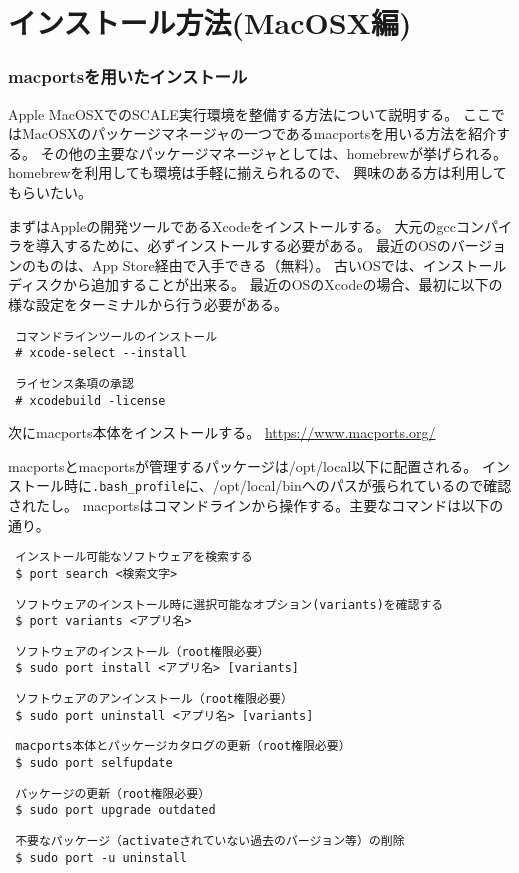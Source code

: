\section{インストール方法(MacOSX編)}

\subsubsection{macportsを用いたインストール}

Apple MacOSXでのSCALE実行環境を整備する方法について説明する。
ここではMacOSXのパッケージマネージャの一つであるmacportsを用いる方法を紹介する。
その他の主要なパッケージマネージャとしては、homebrewが挙げられる。homebrewを利用しても環境は手軽に揃えられるので、
興味のある方は利用してもらいたい。

まずはAppleの開発ツールであるXcodeをインストールする。
大元のgccコンパイラを導入するために、必ずインストールする必要がある。
最近のOSのバージョンのものは、App Store経由で入手できる（無料）。
古いOSでは、インストールディスクから追加することが出来る。
最近のOSのXcodeの場合、最初に以下の様な設定をターミナルから行う必要がある。
\begin{verbatim}
 コマンドラインツールのインストール
 # xcode-select --install
\end{verbatim}
\begin{verbatim}
 ライセンス条項の承認
 # xcodebuild -license
\end{verbatim}

次にmacports本体をインストールする。
\url{https://www.macports.org/}

macportsとmacportsが管理するパッケージは/opt/local以下に配置される。
インストール時に\verb|.bash_profile|に、/opt/local/binへのパスが張られているので確認されたし。
macportsはコマンドラインから操作する。主要なコマンドは以下の通り。

\begin{verbatim}
 インストール可能なソフトウェアを検索する
 $ port search <検索文字>
\end{verbatim}
\begin{verbatim}
 ソフトウェアのインストール時に選択可能なオプション(variants)を確認する
 $ port variants <アプリ名>
\end{verbatim}
\begin{verbatim}
 ソフトウェアのインストール（root権限必要）
 $ sudo port install <アプリ名> [variants]
\end{verbatim}
\begin{verbatim}
 ソフトウェアのアンインストール（root権限必要）
 $ sudo port uninstall <アプリ名> [variants]
\end{verbatim}
\begin{verbatim}
 macports本体とパッケージカタログの更新（root権限必要）
 $ sudo port selfupdate
\end{verbatim}
\begin{verbatim}
 パッケージの更新（root権限必要）
 $ sudo port upgrade outdated
\end{verbatim}
\begin{verbatim}
 不要なパッケージ（activateされていない過去のバージョン等）の削除
 $ sudo port -u uninstall
\end{verbatim}

